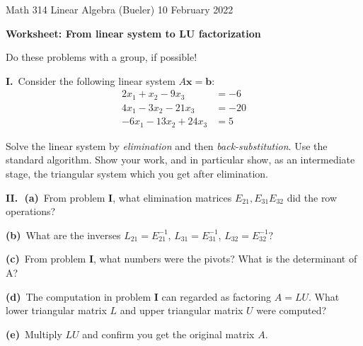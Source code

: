 \documentclass[12pt]{amsart}
\newcommand{\bb}{\mathbf{b}}
\newcommand{\bx}{\mathbf{x}}
\newcommand{\prob}[1]{\bigskip\noindent\textbf{#1.}\, }
\newcommand{\epart}[1]{\bigskip\noindent\textbf{(#1)}\, }
\newcommand{\ppart}[1]{\,\textbf{(#1)}\, }
\begin{document}
\scriptsize \noindent Math 314 Linear Algebra (Bueler) \hfill 10 February 2022 
\normalsize\medskip

\Large\centerline{\textbf{Worksheet: From linear system to LU factorization}}
\medskip
\normalsize

\thispagestyle{empty}
\begin{center}
Do these problems with a group, if possible!
\end{center}

\prob{I}  Consider the following linear system $A\bx = \bb$:
\begin{align*}
2 x_1 + x_2 - 9 x_3 &= -6 \\
4 x_1 - 3 x_2 -21 x_3 &= -20 \\
-6 x_1 - 13 x_2 + 24 x_3 &= 5
\end{align*}
\begin{comment}
L =      1         0         0
         2         1         0
        -3         2         1
U =      2         1        -9
         0        -5        -3
         0         0         3
>> A = L*U
A =      2         1        -9
         4        -3       -21
        -6       -13        24
>> x = [1 1 1]';
>> b = A*x
b =     -6
       -20
         5
\end{comment}
Solve the linear system by \emph{elimination} and then \emph{back-substitution}.  Use the standard algorithm.  Show your work, and in particular show, as an intermediate stage, the triangular system which you get after elimination.
\vfill

\clearpage
\newpage
\prob{II}  \ppart{a}  From problem \textbf{I}, what elimination matrices $E_{21},E_{31}E_{32}$ did the row operations?
\vfill

\epart{b}  What are the inverses $L_{21}=E_{21}^{-1}$, $L_{31}=E_{31}^{-1}$, $L_{32}=E_{32}^{-1}$?
\vfill

\epart{c}  From problem \textbf{I}, what numbers were the pivots?  What is the determinant of A?
\vfill

\epart{d}  The computation in problem \textbf{I} can regarded as factoring $A=LU$.  What lower triangular matrix $L$ and upper triangular matrix $U$ were computed?
\vfill

\epart{e}  Multiply $LU$ and confirm you get the original matrix $A$.
\vspace{0.5in}


\end{document}

